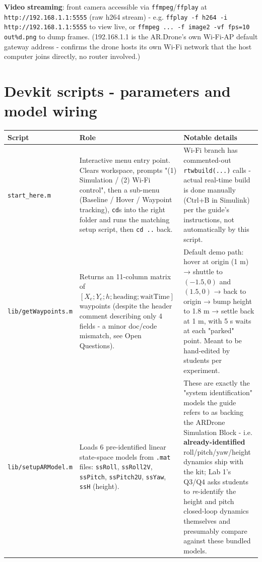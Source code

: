 \documentclass[11pt]{article}
\begin{document}
\textbf{Video streaming}: front camera accessible via \texttt{ffmpeg}/\texttt{ffplay} at \texttt{http://192.168.1.1:5555} (raw h264 stream) - e.g. \texttt{ffplay -f h264 -i http://192.168.1.1:5555} to view live, or \texttt{ffmpeg ... -f image2 -vf fps=10 out\%d.png} to dump frames. (192.168.1.1 is the AR.Drone's own Wi-Fi-AP default gateway address - confirms the drone hosts its own Wi-Fi network that the host computer joins directly, no router involved.)

\section{Devkit scripts - parameters and model wiring}

\begin{center}
\small
\setlength{\tabcolsep}{3pt}
\begin{longtable}{|p{2.9cm}|p{4.7cm}|p{6.6cm}|}
\hline
Script & Role & Notable details \\
\hline
\endhead
\texttt{start\_\allowbreak{}here.m} & Interactive menu entry point. Clears workspace, prompts "(1) Simulation / (2) Wi-Fi control", then a sub-menu (Baseline / Hover / Waypoint tracking), \texttt{cd}s into the right folder and runs the matching setup script, then \texttt{cd ..} back. & Wi-Fi branch has commented-out \texttt{rtwbuild(...)} calls - actual real-time build is done manually (Ctrl+B in Simulink) per the guide's instructions, not automatically by this script. \\
\hline
\texttt{lib/\allowbreak{}getWaypoints.m} & Returns an 11-column matrix of $[X_e; Y_e; h; \text{heading}; \text{waitTime}]$ waypoints (despite the header comment describing only 4 fields - a minor doc/code mismatch, see Open Questions). & Default demo path: hover at origin (1 m) → shuttle to $(-1.5,0)$ and $(1.5,0)$ → back to origin → bump height to 1.8 m → settle back at 1 m, with 5 s waits at each "parked" point. Meant to be hand-edited by students per experiment. \\
\hline
\texttt{lib/\allowbreak{}setupARModel.m} & Loads 6 pre-identified linear state-space models from \texttt{.mat} files: \texttt{ssRoll}, \texttt{ssRoll2V}, \texttt{ssPitch}, \texttt{ssPitch2U}, \texttt{ssYaw}, \texttt{ssH} (height). & These are exactly the "system identification" models the guide refers to as backing the ARDrone Simulation Block - i.e. \textbf{already-identified} roll/pitch/yaw/height dynamics ship with the kit; Lab 1's Q3/Q4 asks students to \textit{re}-identify the height and pitch closed-loop dynamics themselves and presumably compare against these bundled models. \\

\end{longtable}
\end{center}
\end{document}
